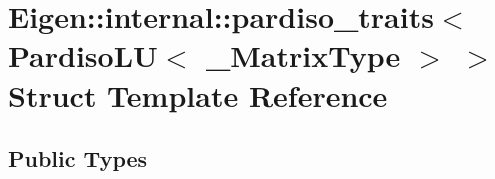 \hypertarget{struct_eigen_1_1internal_1_1pardiso__traits_3_01_pardiso_l_u_3_01___matrix_type_01_4_01_4}{}\section{Eigen\+:\+:internal\+:\+:pardiso\+\_\+traits$<$ Pardiso\+LU$<$ \+\_\+\+Matrix\+Type $>$ $>$ Struct Template Reference}
\label{struct_eigen_1_1internal_1_1pardiso__traits_3_01_pardiso_l_u_3_01___matrix_type_01_4_01_4}
\subsection*{Public Types}
